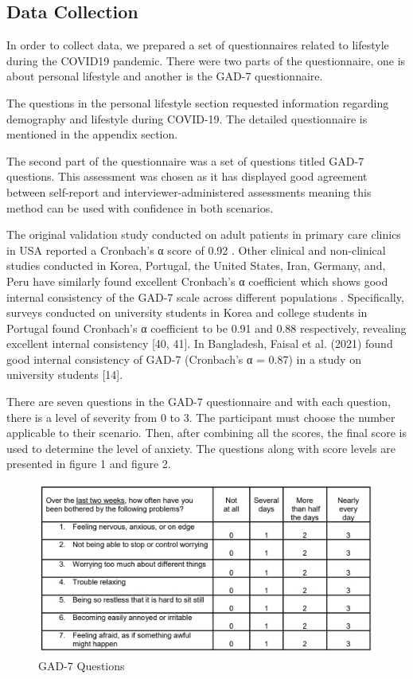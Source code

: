\documentclass[12pt, english]{article}
\begin{document}
\subsection{Data Collection}
In order to collect data, we prepared a set of questionnaires related to lifestyle during the COVID19 pandemic. There were two parts of the questionnaire, one is about personal lifestyle and another is the GAD-7 questionnaire. 

The questions in the personal lifestyle section requested information regarding demography and lifestyle during COVID-19. The detailed questionnaire is mentioned in the appendix section. 

The second part of the questionnaire was a set of questions titled GAD-7 questions. This assessment was chosen as it has displayed good agreement between self-report and interviewer-administered assessments meaning this method can be used with confidence in both scenarios.  

The original validation study conducted on adult patients in primary care clinics in USA reported a Cronbach’s α score of 0.92 \cite{3}. Other clinical and non-clinical studies conducted in Korea, Portugal, the United States, Iran, Germany, and, Peru have similarly found excellent Cronbach’s α coefficient which shows good internal consistency of the GAD-7 scale across different populations \cite{4, 5, 6, 7, 8}. Specifically, surveys conducted on university students in Korea and college students in Portugal found Cronbach’s α coefficient to be 0.91 and 0.88 respectively, revealing excellent internal consistency [40, 41]. In Bangladesh, Faisal et al. (2021) found good internal consistency of GAD-7 (Cronbach’s α = 0.87) in a study on university students [14]. 

There are seven questions in the GAD-7 questionnaire and with each question, there is a level of severity from 0 to 3. The participant must choose the number applicable to their scenario. Then, after combining all the scores, the final score is used to determine the level of anxiety. The questions along with score levels are presented in figure 1 and figure 2.


\begin{figure}[H]
\includegraphics[width=\textwidth]{images/GAD7_questions.png}
\centering
\caption{GAD-7 Questions}
\end{figure}
\end{document}

